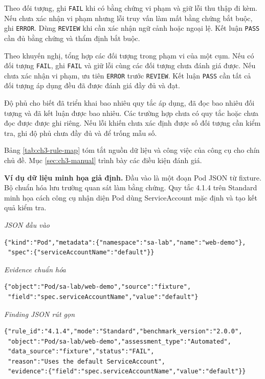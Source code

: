 Theo đối tượng, ghi \texttt{FAIL} khi có bằng chứng vi phạm và giữ lỗi thu thập đi kèm. Nếu chưa xác nhận vi phạm nhưng lỗi truy vấn làm mất bằng chứng bắt buộc, ghi \texttt{ERROR}. Dùng \texttt{REVIEW} khi cần xác nhận ngữ cảnh hoặc ngoại lệ. Kết luận \texttt{PASS} cần đủ bằng chứng và thẩm định bắt buộc.

Theo khuyến nghị, tổng hợp các đối tượng trong phạm vi của một cụm. Nếu có đối tượng \texttt{FAIL}, ghi \texttt{FAIL} và giữ lỗi cùng các đối tượng chưa đánh giá được. Nếu chưa xác nhận vi phạm, ưu tiên \texttt{ERROR} trước \texttt{REVIEW}. Kết luận \texttt{PASS} cần tất cả đối tượng áp dụng đều đã được đánh giá đầy đủ và đạt.

Độ phủ cho biết đã triển khai bao nhiêu quy tắc áp dụng, đã đọc bao nhiêu đối tượng và đã kết luận được bao nhiêu. Các trường hợp chưa có quy tắc hoặc chưa đọc được được ghi riêng. Nếu lỗi khiến chưa xác định được số đối tượng cần kiểm tra, ghi độ phủ chưa đầy đủ và để trống mẫu số.

Bảng \ref{tab:ch3-rule-map} tóm tắt nguồn dữ liệu và công việc của công cụ cho chín chủ đề. Mục \ref{sec:ch3-manual} trình bày các điều kiện đánh giá.

{\small{}}

\noindent\begin{minipage}{\linewidth}
\textbf{Ví dụ dữ liệu minh họa giả định.}
Đầu vào là một đoạn Pod JSON từ fixture. Bộ chuẩn hóa lưu trường quan sát làm bằng chứng. Quy tắc 4.1.4 trên Standard minh họa cách công cụ nhận diện Pod dùng ServiceAccount mặc định và tạo kết quả kiểm tra.

{\chapterthreecodesettings
\textit{JSON đầu vào}
\begin{verbatim}
{"kind":"Pod","metadata":{"namespace":"sa-lab","name":"web-demo"},
 "spec":{"serviceAccountName":"default"}}
\end{verbatim}
\textit{Evidence chuẩn hóa}
\begin{verbatim}
{"object":"Pod/sa-lab/web-demo","source":"fixture",
 "field":"spec.serviceAccountName","value":"default"}
\end{verbatim}
\textit{Finding JSON rút gọn}
\begin{verbatim}
{"rule_id":"4.1.4","mode":"Standard","benchmark_version":"2.0.0",
 "object":"Pod/sa-lab/web-demo","assessment_type":"Automated",
 "data_source":"fixture","status":"FAIL",
 "reason":"Uses the default ServiceAccount",
 "evidence":{"field":"spec.serviceAccountName","value":"default"}}
\end{verbatim}
}
\end{minipage}

